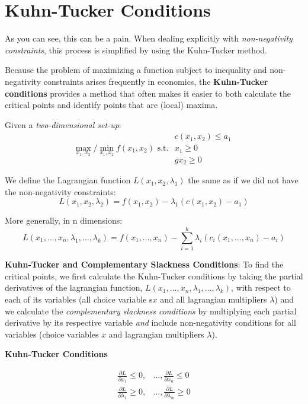 \documentclass[]{book}
\theoremstyle{definition}
\theoremstyle{definition}
\theoremstyle{definition}
\theoremstyle{remark}
\begin{document}
\section{Kuhn-Tucker Conditions}\label{kuhn-tucker-conditions}

As you can see, this can be a pain. When dealing explicitly with
\emph{non-negativity constraints}, this process is simplified by using
the Kuhn-Tucker method.

Because the problem of maximizing a function subject to inequality and
non-negativity constraints arises frequently in economics, the
\textbf{Kuhn-Tucker conditions} provides a method that often makes it
easier to both calculate the critical points and identify points that
are (local) maxima.

Given a \emph{two-dimensional set-up}:
\[\max_{x_1,x_2}/\min_{x_1,x_2} f(x_1,x_2) \text{ s.t. }
\begin{array}{l}
c(x_1,x_2) \le a_1\\
x_1 \ge 0 \\
gx_2 \ge 0
\end{array}\]

We define the Lagrangian function \(L(x_1,x_2,\lambda_1)\) the same as
if we did not have the non-negativity constraints:
\[L(x_1,x_2,\lambda_2) = f(x_1,x_2) - \lambda_1(c(x_1,x_2) - a_1)\]

More generally, in n dimensions:
\[ L(x_1, \dots, x_n, \lambda_1, \dots, \lambda_k) = f(x_1, \dots, x_n) - \sum_{i=1}^k\lambda_i(c_i(x_1,\dots, x_n) - a_i)\]

\textbf{Kuhn-Tucker and Complementary Slackness Conditions}: To find the
critical points, we first calculate the Kuhn-Tucker conditions by taking
the partial derivatives of the lagrangian function,
\(L(x_1,\dots,x_n,\lambda_1,\dots,\lambda_k)\), with respect to each of
its variables (all choice variable s\(x\) and all lagrangian multipliers
\(\lambda\)) and we calculate the \emph{complementary slackness
conditions} by multiplying each partial derivative by its respective
variable \emph{and} include non-negativity conditions for all variables
(choice variables \(x\) and lagrangian multipliers \(\lambda\)).

\textbf{Kuhn-Tucker Conditions}

\begin{align*}
\frac{\partial L}{\partial x_1} \leq 0, & \dots, \frac{\partial L}{\partial x_n} \leq 0\\
\frac{\partial L}{\partial \lambda_1} \geq 0, & \dots, \frac{\partial L}{\partial \lambda_m} \geq 0
\end{align*}
\end{document}
